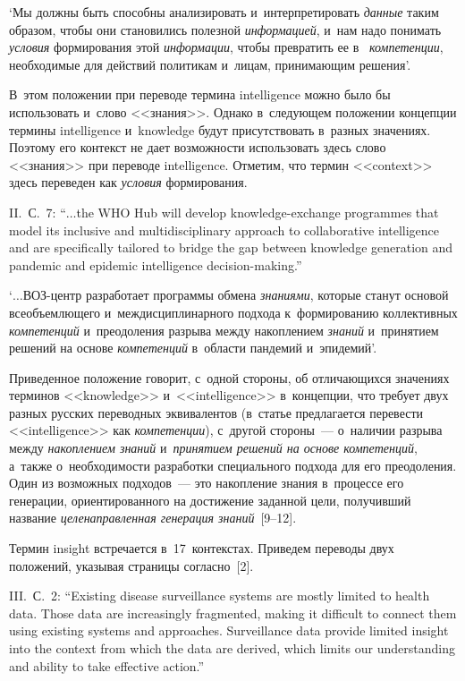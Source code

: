 \begin{multicols}{2}
`Мы должны быть способны анализировать и~интерпретировать \textit{данные} 
таким образом, чтобы они становились полезной \textit{информацией}, и~нам надо 
понимать \textit{условия} формирования этой \textit{информации}, чтобы превратить 
ее в~ \textit{компетенции}, необходимые для действий политикам и~лицам, 
принимающим решения'.

В~этом положении при переводе термина intelligence можно было бы 
использовать и~слово <<знания>>. Однако в~следующем положении концепции 
термины intelligence и~knowledge будут присутствовать в~разных значениях. 
Поэтому его контекст не дает возможности использовать здесь слово <<знания>> 
при переводе intelligence. Отметим, что термин <<context>> здесь переведен как 
\textit{условия} формирования.


II.~С.~7: ``$\ldots$the WHO Hub will develop knowledge-exchange programmes that 
model its inclusive and multidisciplinary approach to collaborative intelligence and are 
specifically tailored to bridge the gap between knowledge generation and pandemic and 
epidemic intelligence decision-making.''

`$\ldots$ВОЗ-центр разработает программы обмена \textit{знаниями}, которые 
станут основой всеобъемлющего и~междисциплинарного подхода 
к~формированию коллективных \textit{компетенций} и~преодоления разрыва 
между накоплением \textit{знаний} и~принятием решений на основе 
\textit{компетенций} в~области пандемий и~эпидемий'.

Приведенное положение говорит, с~одной стороны, об отличающихся значениях 
терминов <<knowledge>> и~<<intelligence>> в~концепции, что требует двух 
разных русских переводных эквивалентов (в~статье предлагается перевести 
<<intelligence>> как \textit{компетенции}), с~другой стороны~--- о~наличии разрыва 
между \textit{накоплением знаний} и~\textit{принятием решений на основе 
компетенций}, а~также о~необходимости разработки специального подхода для 
его преодоления. Один из возможных подходов~--- это накопление знания 
в~процессе его генерации, ориентированного на достижение заданной цели, 
получивший название \textit{целенаправленная генерация знаний}~[9--12].

Термин insight встречается в~17~контекстах. Приведем переводы двух 
положений, указывая страницы согласно~[2].


III.~С.~2: ``Existing disease surveillance systems are mostly limited to health data. 
Those data are increasingly fragmented, making it difficult to connect them using 
existing systems and approaches. Surveillance data provide limited insight into the 
context from which the data are derived, which limits our understanding and ability to 
take effective action.''


\end{multicols}
